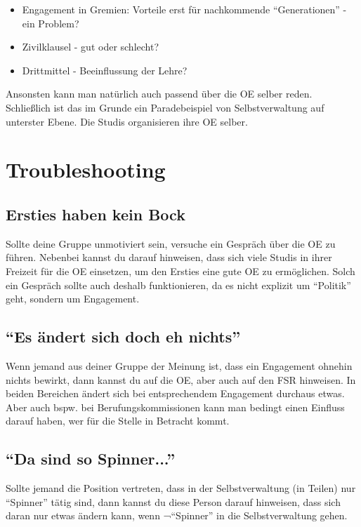 \documentclass[a4paper,11pt]{scrartcl} %
\newenvironment{myitemize}{\begin{itemize}\itemsep -2pt}{\end{itemize}} %
\begin{document}
\begin{myitemize}
  \item Engagement in Gremien: Vorteile erst für nachkommende "`Generationen"' - ein Problem?
  \item Zivilklausel - gut oder schlecht?
  \item Drittmittel - Beeinflussung der Lehre?
\end{myitemize}

Ansonsten kann man natürlich auch passend über die OE selber reden. Schließlich ist das im Grunde
ein Paradebeispiel von Selbstverwaltung auf unterster Ebene. Die Studis organisieren ihre OE selber.

\section{Troubleshooting}

\subsection{Ersties haben kein Bock}

Sollte deine Gruppe unmotiviert sein, versuche ein Gespräch über die OE zu führen. Nebenbei kannst
du darauf hinweisen, dass sich viele Studis in ihrer Freizeit für die OE einsetzen, um den Ersties
eine gute OE zu ermöglichen. Solch ein Gespräch sollte auch deshalb funktionieren, da es nicht explizit
um "`Politik"' geht, sondern um Engagement.

\subsection{"`Es ändert sich doch eh nichts"'}

Wenn jemand aus deiner Gruppe der Meinung ist, dass ein Engagement ohnehin nichts bewirkt, dann kannst
du auf die OE, aber auch auf den FSR hinweisen. In beiden Bereichen ändert sich bei entsprechendem
Engagement durchaus etwas. Aber auch bspw. bei Berufungskommissionen kann man bedingt einen Einfluss darauf
haben, wer für die Stelle in Betracht kommt.

\subsection{"`Da sind so Spinner..."'}

Sollte jemand die Position vertreten, dass in der Selbstverwaltung (in Teilen) nur "`Spinner"' tätig sind,
dann kannst du diese Person darauf hinweisen, dass sich daran nur etwas ändern kann, wenn ¬"`Spinner"'
in die Selbstverwaltung gehen.
\end{document}
